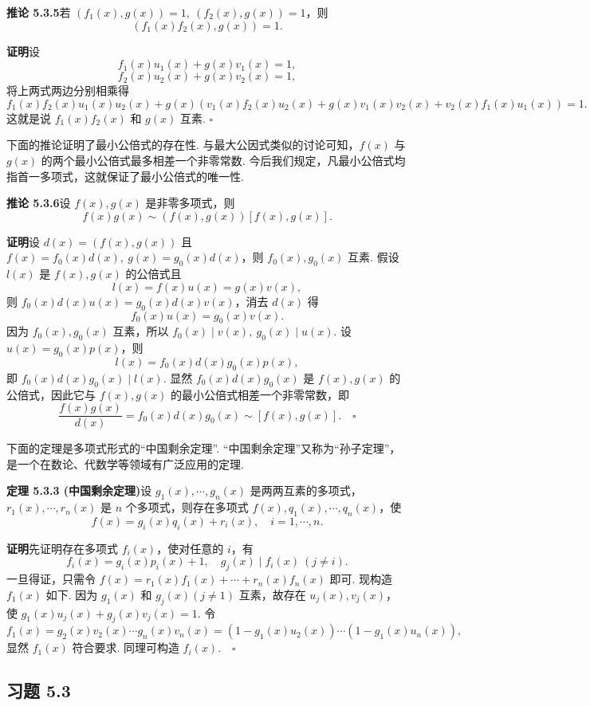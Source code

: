 \documentclass[UTF8,12pt,a4paper,fontset=fandol]{ctexart}
\begin{document}
\noindent\textbf{推论 5.3.5}\quad 若 $(f_1(x),g(x))=1,\ (f_2(x),g(x))=1$，则
\[
(f_1(x)f_2(x),g(x))=1.
\]

\noindent\textbf{证明}\quad 设
\[
f_1(x)u_1(x)+g(x)v_1(x)=1,
\]
\[
f_2(x)u_2(x)+g(x)v_2(x)=1,
\]
将上两式两边分别相乘得
\[
f_1(x)f_2(x)u_1(x)u_2(x)+g(x)(v_1(x)f_2(x)u_2(x)+g(x)v_1(x)v_2(x)+v_2(x)f_1(x)u_1(x))=1.
\]
这就是说 $f_1(x)f_2(x)$ 和 $g(x)$ 互素. $\square$

下面的推论证明了最小公倍式的存在性. 与最大公因式类似的讨论可知，$f(x)$ 与 $g(x)$ 的两个最小公倍式最多相差一个非零常数. 今后我们规定，凡最小公倍式均指首一多项式，这就保证了最小公倍式的唯一性.

\noindent\textbf{推论 5.3.6}\quad 设 $f(x),g(x)$ 是非零多项式，则
\[
f(x)g(x)\sim (f(x),g(x))[f(x),g(x)].
\]

\noindent\textbf{证明}\quad 设 $d(x)=(f(x),g(x))$ 且 $f(x)=f_0(x)d(x),\ g(x)=g_0(x)d(x)$，则 $f_0(x),g_0(x)$ 互素. 假设 $l(x)$ 是 $f(x),g(x)$ 的公倍式且
\[
l(x)=f(x)u(x)=g(x)v(x),
\]
则 $f_0(x)d(x)u(x)=g_0(x)d(x)v(x)$，消去 $d(x)$ 得
\[
f_0(x)u(x)=g_0(x)v(x).
\]
因为 $f_0(x),g_0(x)$ 互素，所以 $f_0(x)\mid v(x),\ g_0(x)\mid u(x)$. 设 $u(x)=g_0(x)p(x)$，则
\[
l(x)=f_0(x)d(x)g_0(x)p(x),
\]
即 $f_0(x)d(x)g_0(x)\mid l(x)$. 显然 $f_0(x)d(x)g_0(x)$ 是 $f(x),g(x)$ 的公倍式，因此它与 $f(x),g(x)$ 的最小公倍式相差一个非零常数，即
\[
\frac{f(x)g(x)}{d(x)}=f_0(x)d(x)g_0(x)\sim [f(x),g(x)].\quad \square
\]

下面的定理是多项式形式的“中国剩余定理”. “中国剩余定理”又称为“孙子定理”，是一个在数论、代数学等领域有广泛应用的定理.

\noindent\textbf{定理 5.3.3 (中国剩余定理)}\quad 设 $g_1(x),\cdots,g_n(x)$ 是两两互素的多项式，$r_1(x),\cdots,r_n(x)$ 是 $n$ 个多项式，则存在多项式 $f(x),q_1(x),\cdots,q_n(x)$，使
\[
f(x)=g_i(x)q_i(x)+r_i(x),\quad i=1,\cdots,n.
\]

\noindent\textbf{证明}\quad 先证明存在多项式 $f_i(x)$，使对任意的 $i$，有
\[
f_i(x)=g_i(x)p_i(x)+1,\quad g_j(x)\mid f_i(x)\ (j\neq i).
\]
一旦得证，只需令 $f(x)=r_1(x)f_1(x)+\cdots+r_n(x)f_n(x)$ 即可. 现构造 $f_1(x)$ 如下. 因为 $g_1(x)$ 和 $g_j(x)(j\neq 1)$ 互素，故存在 $u_j(x),v_j(x)$，使 $g_1(x)u_j(x)+g_j(x)v_j(x)=1$. 令
\[
f_1(x)=g_2(x)v_2(x)\cdots g_n(x)v_n(x)=(1-g_1(x)u_2(x))\cdots(1-g_1(x)u_n(x)),
\]
显然 $f_1(x)$ 符合要求. 同理可构造 $f_i(x).\quad \square$

\subsection*{习题 5.3}
\end{document}
